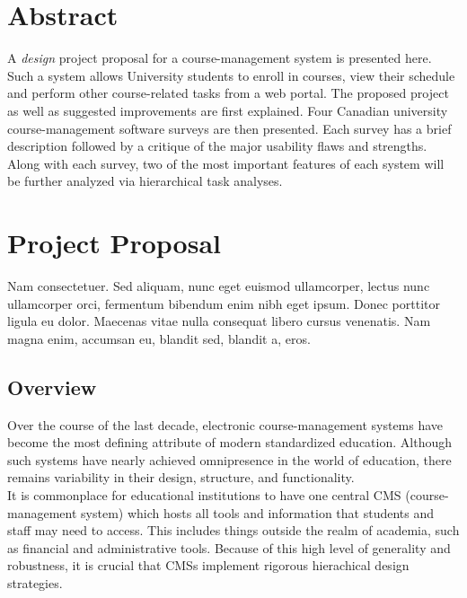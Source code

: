\documentclass[10pt]{article}
\begin{document}
\begin{multicols}{2}

\section*{Abstract}
A \emph{design} project proposal for a course-management system is presented 
here. Such a system allows University students to enroll in courses, view their 
schedule and perform other course-related tasks from a web portal. The proposed 
project as well as suggested improvements are first explained. Four Canadian 
university course-management software surveys are then presented. Each survey 
has a brief description followed by a critique of the major usability flaws and 
strengths. Along with each survey, two of the most important features of each 
system will be further analyzed via hierarchical task analyses. 

\section*{Project Proposal}
Nam consectetuer. Sed aliquam, nunc eget euismod ullamcorper, lectus nunc 
ullamcorper orci, fermentum bibendum enim nibh eget ipsum. Donec porttitor 
ligula eu dolor. Maecenas vitae nulla consequat libero cursus venenatis. Nam 
magna enim, accumsan eu, blandit sed, blandit a, eros. 

\subsection*{Overview}
Over the course of the last decade, electronic course-management systems have 
become the most defining attribute of modern standardized education. Although 
such systems have nearly achieved omnipresence in the world of education, there 
remains variability in their design, structure, and functionality.\\

It is commonplace for educational institutions to have one central CMS (course-
management system) which hosts all tools and information that students and staff 
may need to access. This includes things outside the realm of academia, such as 
financial and administrative tools. Because of this high level of generality and 
robustness, it is crucial that CMSs implement rigorous hierachical design strategies.\\


\end{multicols}
\end{document}

